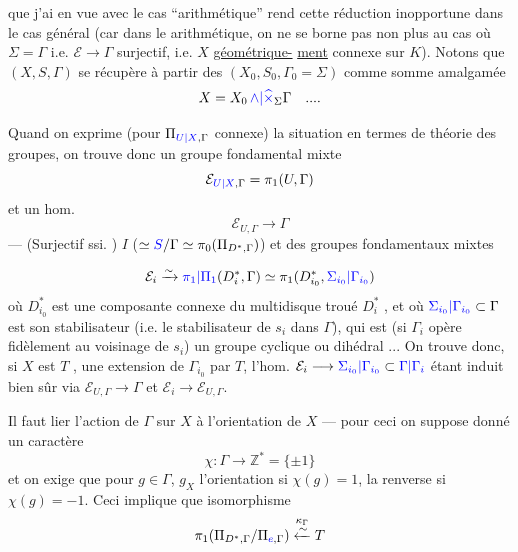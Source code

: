 
que j'ai en vue avec le cas ``arithmétique''
rend cette réduction inopportune dans le
cas général (car dans le  arithmétique,
on ne se borne pas non plus au cas où
$\Sigma=\Gamma$ i.e. $\mathcal E\longrightarrow\Gamma$ surjectif, i.e. 
$X$ \uline{géométrique-}
\uline{ment} connexe sur $K$). Notons  que
$(X,S,\Gamma)$ se récupère à partir des
$(X_0,S_0,\Gamma_0=\Sigma)$ comme somme amalgamée
\[
X=X_0\,\textcolor{blue}{\wedge|\widehat\times}_{\Sigma}\Gamma\quad ....
\]

Quand on exprime (pour $\Pi_{\textcolor{blue}{U|X},\Gamma}$ connexe)
la situation en termes de théorie des groupes,
on trouve donc  un groupe
fondamental  mixte
\[
\mathcal E_{\textcolor{blue}{U|X},\Gamma}=\pi_1(U,\Gamma)
\]
et un hom.
\[
\mathcal E_{U,\Gamma}\longrightarrow\Gamma
\]
--- (Surjectif ssi. 
)
$I$ ($\simeq\textcolor{blue}{S}/\Gamma\simeq\pi_0(\Pi_{D^*,\Gamma})$) et des
groupes fondamentaux mixtes


\[
\mathcal E_i\xrightarrow{\sim}\textcolor{blue}{\pi_1|\Pi_1}(D_i^*,\Gamma)
\simeq\pi_1(D_{i_0}^*,\textcolor{blue}{\Sigma_{i_0}|\Gamma_{i_0}})
\]
où $D_{i_0}^*$ est une composante connexe du
multidisque troué $D_i^*$ , et où $\textcolor{blue}{\Sigma_{i_0}|\Gamma_{i_0}}\subset\Gamma$ est
son stabilisateur (i.e. le stabilisateur de
$s_i$ dans $\Gamma$), qui est  (si $\Gamma_i$  opère
fidèlement au voisinage de $s_i$) un groupe cyclique
ou dihédral ... On trouve donc, si $X$ est
$T$ , une extension de $\Gamma_{i_0}$ par $T$,
l'hom. $\mathcal E_i\longrightarrow\textcolor{blue}{\Sigma_{i_0}|\Gamma_{i_0}}\subset\textcolor{blue}{\Gamma|\Gamma_i}$ étant induit
bien sûr via $\mathcal E_{U,\Gamma}\longrightarrow\Gamma$ et $\mathcal E_i\longrightarrow\mathcal E_{U,\Gamma}$.

Il faut  lier l'action de $\Gamma$ sur $X$ à
l'orientation de $X$ --- pour ceci on suppose
donné un caractère
\[
\chi:\Gamma\longrightarrow\mathbb Z^*=\{\pm1\}
\]
et on exige que pour $g\in\Gamma$, $g_X$ 
l'orientation si $\chi(g)=1$, la renverse si $\chi(g)=-1$.
Ceci implique que  isomorphisme
\[
\pi_1(\Pi_{D^*,\Gamma}/\Pi_{\textcolor{blue}{e},\Gamma})
\overset{\kappa_\Gamma}{\xleftarrow{\sim}}T
\]

